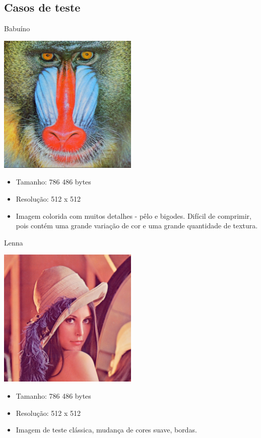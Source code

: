 \documentclass{beamer}
\begin{document}
\subsection{Casos de teste}
\begin{frame}{Babuíno}
   \begin{multicols}{2}
      \includegraphics[width=0.5\textwidth]{figure/baboon100.jpg}
      \begin{itemize}
         \item Tamanho: 786 486 bytes
         \item Resolução: 512 x 512
         \item Imagem colorida com muitos detalhes - pêlo e bigodes. Difícil de comprimir, pois contém uma grande variação de cor e uma grande quantidade de textura.
      \end{itemize}
   \end{multicols}
\end{frame}
\begin{frame}{Lenna}
   \begin{multicols}{2}
      \includegraphics[width=0.5\textwidth]{figure/lenna100.jpg}
      \begin{itemize}
         \item Tamanho: 786 486 bytes
         \item Resolução: 512 x 512
         \item Imagem de teste clássica, mudança de cores suave, bordas.
      \end{itemize}
   \end{multicols}
\end{frame}
\end{document}
